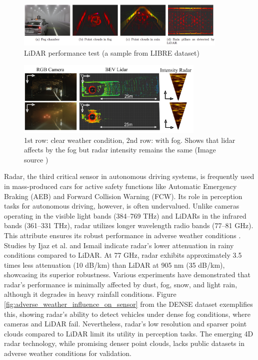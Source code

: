 \documentclass[report.tex]{subfiles}
\begin{document}
    \begin{figure}[h]
        \centering
        \includegraphics[width=0.9\textwidth]{images/lidar_issues.png}
        \caption{LiDAR performance test (a sample from LIBRE \cite{carballo2020libre} dataset)}
        \label{fig:lidar}
    \end{figure}

    \begin{figure}[h]
        \centering
        \includegraphics[width=0.8\textwidth]{images/lidar_in_fog.png}
        \caption{\centering 1st row: clear weather condition, 2nd row: with fog. Shows that lidar affects by the fog but radar intensity remains the same  (Image source \cite{bijelic2020seeing})}
        \label{fig:lidar_in_fog}
    \end{figure}
    
    Radar, the third critical sensor in autonomous driving systems, is frequently used in mass-produced cars for active safety functions like Automatic Emergency Braking (AEB) and Forward Collision Warning (FCW). Its role in perception tasks for autonomous driving, however, is often undervalued. Unlike cameras operating in the visible light bands (384–769 THz) and LiDARs in the infrared bands (361–331 THz), radar utilizes longer wavelength radio bands (77–81 GHz). This attribute ensures its robust performance in adverse weather conditions \cite{Paek2022Jun}. Studies by Ijaz et al. \cite{ijaz2012analysis} and Ismail \cite{gultepe2008measurements} indicate radar's lower attenuation in rainy conditions compared to LiDAR. At 77 GHz, radar exhibits approximately 3.5 times less attenuation (10 dB/km) than LiDAR at 905 nm (35 dB/km), showcasing its superior robustness. Various experiments \cite{adams2012robotic, brooker2007seeing, xu2022learned, gourova2017analysis, zang2019impact} have demonstrated that radar's performance is minimally affected by dust, fog, snow, and light rain, although it degrades in heavy rainfall conditions. Figure \ref{fig:adverse_weather_influence_on_sensor} from the DENSE \cite{bijelic2020seeing} dataset exemplifies this, showing radar's ability to detect vehicles under dense fog conditions, where cameras and LiDAR fail. Nevertheless, radar's low resolution and sparser point clouds compared to LiDAR limit its utility in perception tasks. The emerging 4D radar technology, while promising denser point clouds, lacks public datasets in adverse weather conditions for validation.
\end{document}
